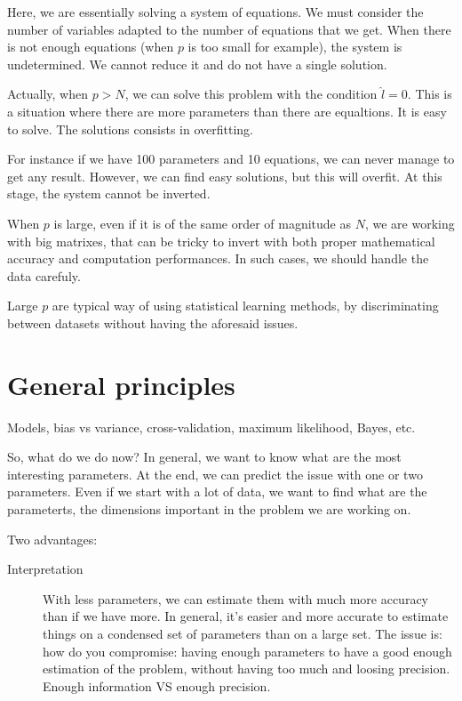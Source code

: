 \documentclass[a4paper]{tufte-book}
\begin{document}
Here, we are essentially solving a system of equations. We must consider the
number of variables adapted to the number of equations that we get. When there is
not enough equations (when $p$ is too small for example), the system is
undetermined. We cannot reduce it and do not have a single solution.

Actually, when $p>N$, we can solve this problem with the condition $\hat{l}=0$.
This is a situation where there are more parameters than there are equaltions. It
is easy to solve. The solutions consists in overfitting.

For instance if we have 100 parameters and 10 equations, we can never manage to
get any result. However, we can find easy solutions, but this will overfit.
At this stage, the system cannot be inverted.

When $p$ is large, even if it is of the same order of magnitude as $N$, we are
working with big matrixes, that can be tricky to invert with both proper
mathematical accuracy and computation performances. In such cases, we should
handle the data carefuly.

Large $p$ are typical way of using statistical learning methods, by
discriminating between datasets without having the aforesaid issues.


\chapter{General principles}
\label{ch:general-principles}

Models, bias vs variance, cross-validation, maximum likelihood, Bayes, etc.


So, what do we do now?
In general, we want to know what are the most interesting parameters. At the end, we can predict the issue with one or two parameters. Even if we start with a lot of data, we want to find what are the parameterts, the dimensions important in the problem we are working on.

Two advantages:
\begin{description}
\item[Interpretation]
With less parameters, we can estimate them with much more accuracy than if we have more.
In general, it’s easier and more accurate to estimate things on a condensed set of parameters than on a large set.
The issue is: how do you compromise: having enough parameters to have a good enough estimation of the problem, without having too much and loosing precision. Enough information VS enough precision.
\end{description}
\end{document}
